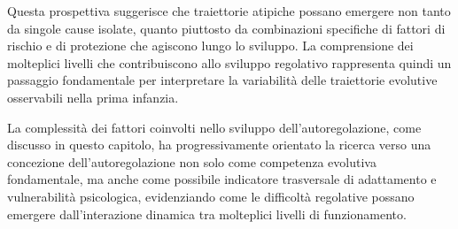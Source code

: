         Questa prospettiva suggerisce che traiettorie atipiche possano emergere non tanto da singole cause isolate, quanto piuttosto da combinazioni specifiche di fattori di rischio e di protezione che agiscono lungo lo sviluppo. La comprensione dei molteplici livelli che contribuiscono allo sviluppo regolativo rappresenta quindi un passaggio fondamentale per interpretare la variabilità delle traiettorie evolutive osservabili nella prima infanzia.

        La complessità dei fattori coinvolti nello sviluppo dell'autoregolazione, come discusso in questo capitolo, ha progressivamente orientato la ricerca verso una concezione dell'autoregolazione non solo come competenza evolutiva fondamentale, ma anche come possibile indicatore trasversale di adattamento e vulnerabilità psicologica, evidenziando come le difficoltà regolative possano emergere dall'interazione dinamica tra molteplici livelli di funzionamento.
